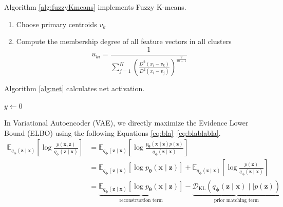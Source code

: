 \documentclass[12pt,letterpaper]{article}
\begin{document}
Algorithm \ref{alg:fuzzyKmeans} implements Fuzzy K-means.

\begin{algorithm}
\caption{Fuzzy K-means clustering algorithm}
\label{alg:fuzzyKmeans}
\begin{enumerate}
    \item Choose primary centroids $v_{k}$
    \item Compute the membership degree of all feature vectors in all clusters
    \begin{equation}
    u_{ki}  = \frac{1}{ \sum_{j=1}^K ( \frac{D^{2}(x_{i} - v_{k})}{D^{2}(x_{i} - v_{j})})^\frac{2} 
    {m-1}}
    \label{eq:kmeans}
    \end{equation}
\end{enumerate}
\end{algorithm}

Algorithm \ref{alg:net} calculates net activation.


\begin{algorithm}
\caption{Computing Net Activation}
\label{alg:net}
{}
$y\leftarrow 0$\;
\end{algorithm}

In Variational Autoencoder (VAE), we directly maximize the Evidence Lower Bound (ELBO) using the following Equations \ref{eq:bla}--\ref{eq:blablabla}.
\begin{align}
  \mathbb{E}_{q_{\boldsymbol{\phi}}(\boldsymbol{z}\mid\boldsymbol{x})}\left[\log\frac{p(\boldsymbol{x}, \boldsymbol{z})}{q_{\boldsymbol{\phi}}(\boldsymbol{z}\mid\boldsymbol{x})}\right]
  &= \mathbb{E}_{q_{\boldsymbol{\phi}}(\boldsymbol{z}\mid\boldsymbol{x})}\left[\log\frac{p_{\boldsymbol{\theta}}(\boldsymbol{x}\mid\boldsymbol{z})p(\boldsymbol{z})}{q_{\boldsymbol{\phi}}(\boldsymbol{z}\mid\boldsymbol{x})}\right] \label{eq:bla} \\
  &= \mathbb{E}_{q_{\boldsymbol{\phi}}(\boldsymbol{z}\mid\boldsymbol{x})}\left[\log p_{\boldsymbol{\theta}}(\boldsymbol{x}\mid\boldsymbol{z})\right] + \mathbb{E}_{q_{\boldsymbol{\phi}}(\boldsymbol{z}\mid\boldsymbol{x})}\left[\log\frac{p(\boldsymbol{z})}{q_{\boldsymbol{\phi}}(\boldsymbol{z}\mid\boldsymbol{x})}\right] \label{eq:blabla} \\
  &= \underbrace{\mathbb{E}_{q_{\boldsymbol{\phi}}(\boldsymbol{z}\mid\boldsymbol{x})}\left[\log p_{\boldsymbol{\theta}}(\boldsymbol{x}\mid\boldsymbol{z})\right]}_\text{reconstruction term} - \underbrace{\mathcal{D}_{\text{KL}}(q_{\boldsymbol{\phi}}(\boldsymbol{z}\mid\boldsymbol{x}) \mid\mid p(\boldsymbol{z}))}_\text{prior matching term} \label{eq:blablabla}
\end{align}
\end{document}
